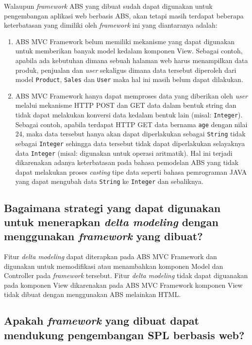 Walaupun \textit{framework} ABS yang dibuat sudah dapat digunakan untuk pengembangan aplikasi web berbasis ABS, akan tetapi masih terdapat beberapa keterbatasan yang dimiliki oleh \textit{framework} ini yang diantaranya adalah:
\begin{enumerate}
    \item ABS MVC Framework belum memiliki mekanisme yang dapat digunakan untuk memberikan banyak model kedalam komponen View. Sebagai contoh, apabila ada kebutuhan dimana sebuah halaman web harus menampilkan data produk, penjualan dan \textit{user} sekaligus dimana data tersebut diperoleh dari model \texttt{Product}, \texttt{Sales} dan \texttt{User} maka hal ini masih belum dapat dilakukan.
    \item ABS MVC Framework hanya dapat memproses data yang diberikan oleh \textit{user} melalui mekanisme HTTP POST dan GET data dalam bentuk string dan tidak dapat melakukan konversi data kedalam bentuk lain (misal: \texttt{Integer}). Sebagai contoh, apabila terdapat HTTP GET data bernama \texttt{age} dengan nilai 24, maka data tersebut hanya akan dapat diperlakukan sebagai \texttt{String} tidak sebagai \texttt{Integer} sehingga data tersebut tidak dapat diperlakukan selayaknya data \texttt{Integer} (misal: digunakan untuk operasi aritmatik). Hal ini terjadi dikarenakan adanya keterbatasan pada bahasa pemodelan ABS yang tidak dapat melakukan proses \textit{casting} tipe data seperti bahasa pemrograman JAVA yang dapat mengubah data \texttt{String} ke \texttt{Integer} dan sebaliknya.
\end{enumerate}

\subsection{Bagaimana strategi yang dapat digunakan untuk menerapkan \textit{delta modeling} dengan menggunakan \textit{framework} yang dibuat?}

Fitur \textit{delta modeling} dapat diterapkan pada ABS MVC Framework dan digunakan untuk memodifikasi atau menambahkan komponen Model dan Controller pada \textit{framework} tersebut. Fitur \textit{delta modeling} tidak dapat diguanakan pada komponen View dikarenakan pada ABS MVC Framework komponen View tidak dibuat dengan menggunakan ABS melainkan HTML.\\

\subsection{Apakah \textit{framework} yang dibuat dapat mendukung pengembangan SPL berbasis web?}

